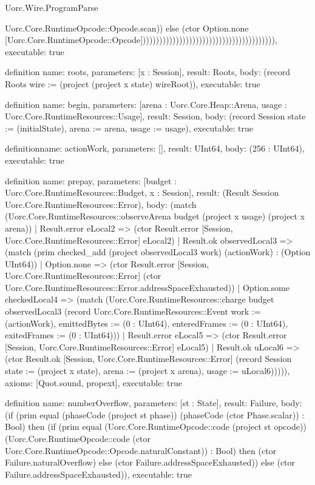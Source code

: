 \begin{lexlean}{Uorc.Wire.ProgramParse}
\begin{semanticmodule}
{Uorc.Core.RuntimeOpcode::Opcode.scan)) else (ctor Option.none [Uorc.Core.RuntimeOpcode::Opcode])))))))))))))))))))))))))))))))))))))))),
  executable: true
}

definition{
  name: roots,
  parameters: [x : Session],
  result: Roots,
  body: (record Roots {wire := (project (project x state) wireRoot)}),
  executable: true
}

definition{
  name: begin,
  parameters: [arena : Uorc.Core.Heap::Arena, usage : Uorc.Core.RuntimeResources::Usage],
  result: Session,
  body: (record Session {state := (initialState), arena := arena, usage := usage}),
  executable: true
}

definition{name: actionWork, parameters: [], result: UInt64, body: (256 : UInt64), executable: true}

definition{
  name: prepay,
  parameters: [budget : Uorc.Core.RuntimeResources::Budget, x : Session],
  result: (Result Session Uorc.Core.RuntimeResources::Error),
  body: (match (Uorc.Core.RuntimeResources::observeArena budget (project x usage) (project x arena))
    | Result.error eLocal2 => (ctor Result.error [Session, Uorc.Core.RuntimeResources::Error] eLocal2)
    | Result.ok observedLocal3 => (match (prim checked_add (project observedLocal3 work) (actionWork) : (Option UInt64))
      | Option.none => (ctor Result.error [Session, Uorc.Core.RuntimeResources::Error] (ctor Uorc.Core.RuntimeResources::Error.addressSpaceExhausted))
      | Option.some checkedLocal4 => (match (Uorc.Core.RuntimeResources::charge budget observedLocal3 (record Uorc.Core.RuntimeResources::Event {work := (actionWork), emittedBytes := (0 : UInt64), enteredFrames := (0 : UInt64), exitedFrames := (0 : UInt64)}))
        | Result.error eLocal5 => (ctor Result.error [Session, Uorc.Core.RuntimeResources::Error] eLocal5)
        | Result.ok uLocal6 => (ctor Result.ok [Session, Uorc.Core.RuntimeResources::Error] (record Session {state := (project x state), arena := (project x arena), usage := uLocal6}))))),
  axioms: [Quot.sound, propext],
  executable: true
}

definition{
  name: numberOverflow,
  parameters: [st : State],
  result: Failure,
  body: (if (prim equal (phaseCode (project st phase)) (phaseCode (ctor Phase.scalar)) : Bool) then (if (prim equal (Uorc.Core.RuntimeOpcode::code (project st opcode)) (Uorc.Core.RuntimeOpcode::code (ctor Uorc.Core.RuntimeOpcode::Opcode.naturalConstant)) : Bool) then (ctor Failure.naturalOverflow) else (ctor Failure.addressSpaceExhausted)) else (ctor Failure.addressSpaceExhausted)),
  executable: true
}


\end{semanticmodule}
\end{lexlean}
